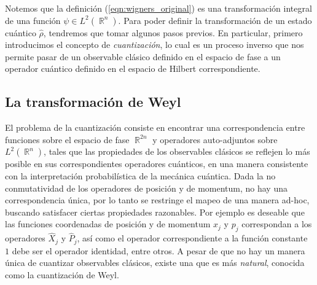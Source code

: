 \documentclass[a4paper,11pt]{report}
\DeclareMathOperator{\R}{\mathbb{R}}
\begin{document}
  Notemos que la definición (\ref{eqn:wigners_original}) es
  una transformación integral de una función $\psi \in
  L^2(\R^{n})$. Para poder definir la transformación de un
  estado cuántico $\hat{\rho}$, tendremos que tomar algunos
  pasos previos. En particular, primero introducimos el
  concepto de \textit{cuantización}, lo cual es un proceso
  inverso que nos permite pasar de un observable clásico
  definido en el espacio de fase a un operador cuántico
  definido en el espacio de Hilbert correspondiente.

  \subsection{La transformación de Weyl}

  El problema de la cuantización consiste en encontrar una
  correspondencia entre funciones sobre el espacio de fase
  $\R^{2n}$ y operadores auto-adjuntos sobre $L^2(\R^{n})$,
  tales que las propiedades de los observables clásicos se
  reflejen lo más posible en sus correspondientes operadores
  cuánticos, en una manera consistente con la interpretación
  probabilística de la mecánica cuántica.  Dada la no
  conmutatividad de los operadores de posición y de
  momentum, no hay una correspondencia única, por lo tanto
  se restringe el mapeo de una manera ad-hoc, buscando
  satisfacer ciertas propiedades razonables. Por ejemplo es
  deseable que las funciones coordenadas de posición y de
  momentum $x_j$ y $p_j$ correspondan a los operadores
  $\hat{X}_j$ y $\hat{P}_j$, así como el operador
  correspondiente a la función constante $1$ debe ser el
  operador identidad, entre otros.  A pesar de que no hay un
  manera única de cuantizar observables clásicos, existe una
  que es más \textit{natural}, conocida como la cuantización
  de Weyl. 
\end{document}
